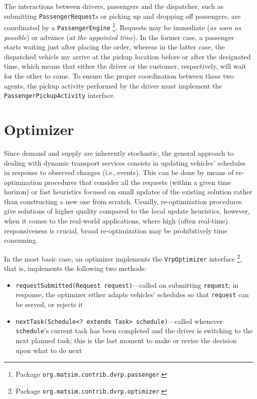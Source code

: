 The interactions between drivers, passengers and the dispatcher, such as submitting \lstinline$PassengerRequest$s or picking up and dropping off passengers, are coordinated by a \lstinline{PassengerEngine}%
\footnote{
Package \lstinline$org.matsim.contrib.dvrp.passenger$.
}.
Requests may be immediate (\emph{as soon as possible}) or advance (\emph{at the appointed time}). In the former case, a passenger starts waiting just after placing the order, whereas in the latter case, the dispatched vehicle my arrive at the pickup location before or after the designated time, which means that either the driver or the customer, respectively, will wait for the other to come. To ensure the proper coordination between these two agents, the pickup activity performed by the driver must implement the \lstinline$PassengerPickupActivity$ interface.

\section{Optimizer}
\label{sec:VRP-optimizer}
Since demand and supply are inherently stochastic, the general approach to dealing with dynamic transport services consists in updating vehicles' schedules in response to observed changes (i.e.,\,events). This can be done by means of re-optimization procedures that consider all the requests (within a given time horizon) or fast heuristics focused on small updates of the existing solution rather than constructing a new one from scratch. Usually, re-optimization procedures give solutions of higher quality compared to the local update heuristics, however, when it comes to the real-world applications, where high (often real-time) responsiveness is crucial, broad re-optimization may be prohibitively time consuming.

In the most basic case, an optimizer implements the \lstinline$VrpOptimizer$ interface%
\footnote{
Package \lstinline$org.matsim.contrib.dvrp.optimizer$.
},
that is, implements the following two methods:
%
\begin{itemize}
	\item \lstinline$requestSubmitted(Request request)$---called on submitting \lstinline$request$; in response, the optimizer either adapts vehicles' schedules so that \lstinline$request$ can be served, or rejects it
	
	\item \lstinline$nextTask(Schedule<? extends Task> schedule)$---called whenever \lstinline$schedule$'s current task has been completed and the driver is switching to the next planned task; this is the last moment to make or revise the decision upon what to do next

\end{itemize}

